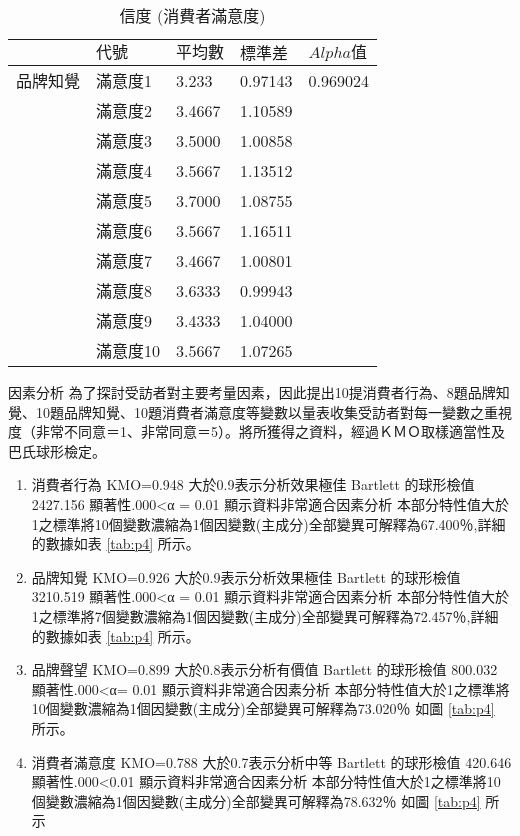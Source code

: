 \begin{table}[htb]
\caption{信度 (消費者滿意度)}
\label{tab:e4}
\renewcommand{\arraystretch}{1.2} %
\arrayrulewidth=1pt               %
\tabcolsep=18pt                   %
\begin{tabular}[t]{lllll}  %
\hline
 & $代號$& $平均數$ & $標準差$& $ Alpha 值 $ \\
\hline
品牌知覺 & 滿意度1&3.233&0.97143&0.969024\\
              & 滿意度2&3.4667&1.10589&  \\
             & 滿意度3&3.5000&1.00858&  \\
             & 滿意度4&3.5667&1.13512&\\
             & 滿意度5&3.7000&1.08755&  \\
             & 滿意度6&3.5667&1.16511&\\
             & 滿意度7&3.4667&1.00801&  \\
             & 滿意度8&3.6333&0.99943&  \\
             & 滿意度9&3.4333&1.04000&\\
             & 滿意度10&3.5667&1.07265&\\
\hline
\end{tabular}
\end{table}

因素分析
為了探討受訪者對主要考量因素，因此提出10提消費者行為、8題品牌知覺、10題品牌知覺、10題消費者滿意度等變數以量表收集受訪者對每一變數之重視度（非常不同意＝1、非常同意＝5）。將所獲得之資料，經過ＫＭＯ取樣適當性及巴氏球形檢定。
\begin{enumerate}
\item 消費者行為
KMO=0.948 大於0.9表示分析效果極佳 Bartlett 的球形檢值 2427.156 顯著性.000<α = 0.01 顯示資料非常適合因素分析  本部分特性值大於1之標準將10個變數濃縮為1個因變數(主成分)全部變異可解釋為67.400％,詳細的數據如表  \ref{tab:p4} 所示。
\item 品牌知覺
KMO=0.926 大於0.9表示分析效果極佳 Bartlett 的球形檢值 3210.519 顯著性.000<α = 0.01 顯示資料非常適合因素分析  本部分特性值大於1之標準將7個變數濃縮為1個因變數(主成分)全部變異可解釋為72.457％,詳細的數據如表  \ref{tab:p4} 所示。
\item 品牌聲望
KMO=0.899 大於0.8表示分析有價值 Bartlett 的球形檢值 800.032 顯著性.000<α= 0.01 顯示資料非常適合因素分析  本部分特性值大於1之標準將10個變數濃縮為1個因變數(主成分)全部變異可解釋為73.020％ 如圖 \ref{tab:p4}  所示。
\item 消費者滿意度
KMO=0.788 大於0.7表示分析中等 Bartlett 的球形檢值 420.646 顯著性.000<0.01 顯示資料非常適合因素分析  本部分特性值大於1之標準將10個變數濃縮為1個因變數(主成分)全部變異可解釋為78.632％ 如圖 \ref{tab:p4} 所示
\end{enumerate}

